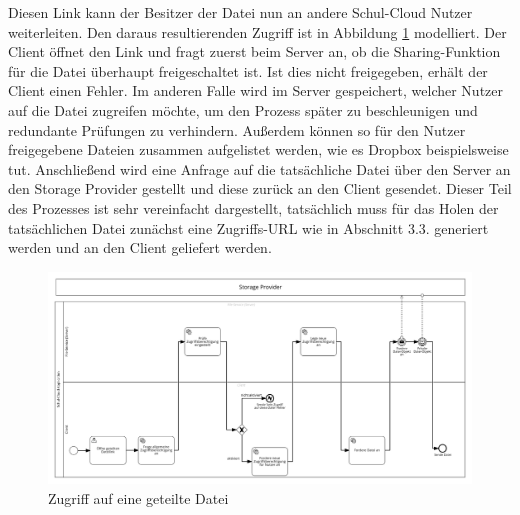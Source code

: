 Diesen Link kann der Besitzer der Datei nun an andere Schul-Cloud Nutzer weiterleiten. Den daraus resultierenden Zugriff ist in Abbildung \ref{fig:filesharingusing} modelliert. Der Client öffnet den Link und fragt zuerst beim Server an, ob die Sharing-Funktion für die Datei überhaupt freigeschaltet ist. Ist dies nicht freigegeben, erhält der Client einen Fehler. Im anderen Falle wird im Server gespeichert, welcher Nutzer auf die Datei zugreifen möchte, um den Prozess später zu beschleunigen und redundante Prüfungen zu verhindern. Außerdem können so für den Nutzer freigegebene Dateien zusammen aufgelistet werden, wie es Dropbox beispielsweise tut. Anschließend wird eine Anfrage auf die tatsächliche Datei über den Server an den Storage Provider gestellt und diese zurück an den Client gesendet. Dieser Teil des Prozesses ist sehr vereinfacht dargestellt, tatsächlich muss für das Holen der tatsächlichen Datei zunächst eine Zugriffs-URL wie in Abschnitt 3.3. generiert werden und an den Client geliefert werden.

\begin{figure}[H]
	\includegraphics[width=1\linewidth]{images/filesharingusing}
	\caption[Caption for concept]{Zugriff auf eine geteilte Datei}
	\centering
	\label{fig:filesharingusing}
\end{figure}


\clearpage
